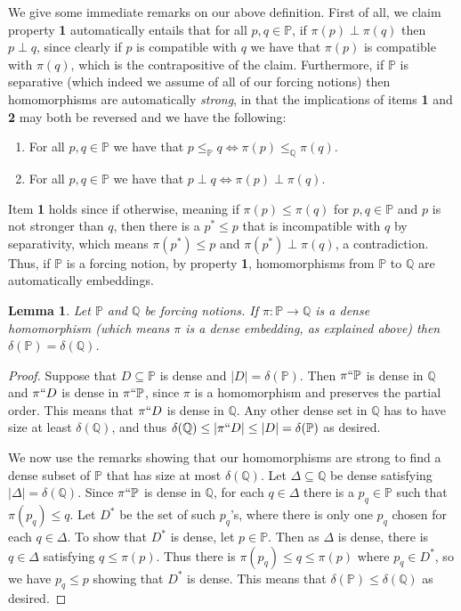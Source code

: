 \documentclass{amsart}
\newtheorem{lemma}[theorem]{Lemma}
\theoremstyle{definition}
\theoremstyle{remark}
\renewcommand{\P}{\mathbb{P}}
\newcommand{\Q}{\mathbb{Q}}
\begin{document}
We give some immediate remarks on our above definition. First of all, we claim property \textbf{1} automatically entails that for all $p,q \in \P$, if $\pi(p) \perp \pi(q)$ then $p \perp q$, since clearly if $p$ is compatible with $q$ we have that $\pi(p)$ is compatible with $\pi(q)$, which is the contrapositive of the claim. Furthermore, if $\P$ is separative (which indeed we assume of all of our forcing notions) then homomorphisms are automatically \textit{strong}, in that the implications of items \textbf{1} and \textbf{2} may both be reversed and we have the following:
\begin{enumerate}
	\item For all $p,q \in \P$ we have that $p \leq_\P q \iff \pi(p) \leq_\Q \pi(q)$.
	\item For all $p,q \in \P$ we have that $p \perp q \iff \pi(p) \perp \pi(q)$.
\end{enumerate}
Item \textbf{1} holds since if otherwise, meaning if $\pi(p) \leq \pi(q)$ for $p,q \in \P$ and $p$ is not stronger than $q$, then there is a $p^*\leq p$ that is incompatible with $q$ by separativity, which means $\pi(p^*) \leq p$ and $\pi(p^*) \perp \pi(q)$, a contradiction. Thus, if $\P$ is a forcing notion, by property \textbf{1}, homomorphisms from $\P$ to $\Q$ are automatically embeddings.

\begin{lemma} \label{lemma:deltasize} Let $\P$ and $\Q$ be forcing notions. If $\pi: \P \to \Q$ is a dense homomorphism (which means $\pi$ is a dense embedding, as explained above) then $\delta(\P)=\delta(\Q)$. \end{lemma} 
\begin{proof}
Suppose that $D \subseteq \P$ is dense and $|D|=\delta(\P)$. Then $\pi ``\P$ is dense in $\Q$ and $\pi``D$ is dense in $\pi``\P$, since $\pi$ is a homomorphism and preserves the partial order. This means that $\pi``D$ is dense in $\Q$. Any other dense set in $\Q$ has to have size at least $\delta(\Q)$, and thus $\delta(\Q) \leq |\pi``D| \leq |D| = \delta(\P)$ as desired. 

We now use the remarks showing that our homomorphisms are strong to find a dense subset of $\P$ that has size at most $\delta(\Q)$. Let $\Delta \subseteq \Q$ be dense satisfying $|\Delta|=\delta(\Q)$. Since $\pi `` \P$ is dense in $\Q$, for each $q \in \Delta$ there is a $p_q \in \P$ such that $\pi(p_q) \leq q$. Let $D^*$ be the set of such $p_q$'s, where there is only one $p_q$ chosen for each $q \in \Delta$. To show that $D^*$ is dense, let $p \in \P$. Then as $\Delta$ is dense, there is $q \in \Delta$ satisfying $q \leq \pi(p)$. Thus there is $\pi(p_q) \leq q \leq \pi(p)$ where $p_q \in D^*$, so we have $p_q \leq p$ showing that $D^*$ is dense. This means that $\delta(\P) \leq \delta(\Q)$ as desired.
\end{proof} 
\end{document}
